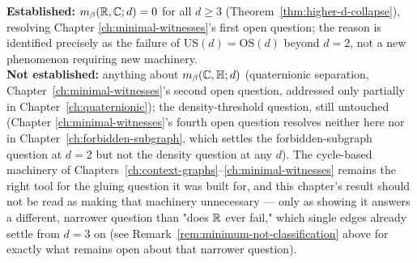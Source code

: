 \begin{ledgerentry}
\textbf{Established:} $m_\beta(\mathbb{R},\mathbb{C};d)=0$ for all $d\ge3$
(Theorem~\ref{thm:higher-d-collapse}), resolving Chapter
\ref{ch:minimal-witnesses}'s first open question; the reason is identified
precisely as the failure of $\mathrm{US}(d)=\mathrm{OS}(d)$ beyond $d=2$,
not a new phenomenon requiring new machinery.\\
\textbf{Not established:} anything about $m_\beta(\mathbb{C},\mathbb{H};d)$ (quaternionic
separation, Chapter~\ref{ch:minimal-witnesses}'s second open question,
addressed only partially in Chapter~\ref{ch:quaternionic}); the
density-threshold question, still untouched (Chapter
\ref{ch:minimal-witnesses}'s fourth open question resolves neither here nor
in Chapter~\ref{ch:forbidden-subgraph}, which settles the forbidden-subgraph
question at $d=2$ but not the density question at any $d$). The cycle-based
machinery of Chapters~\ref{ch:context-graphs}--\ref{ch:minimal-witnesses}
remains the right tool for the gluing question it was built for, and this
chapter's result should not be read as making that machinery unnecessary —
only as showing it answers a different, narrower question than "does $\mathbb{R}$
ever fail," which single edges already settle from $d=3$ on (see
Remark~\ref{rem:minimum-not-classification} above for exactly what remains
open about that narrower question).
\end{ledgerentry}

